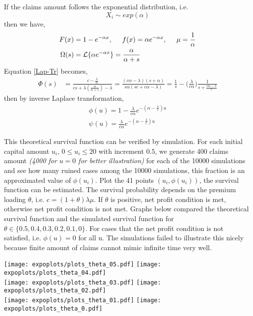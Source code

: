 \documentclass[12pt]{article}
\begin{document}
If the claims amount follows the exponential distribution, i.e. 
\[X_i\sim exp(\alpha)\]
then we have,
\begin{align*}
 F(x)&=1-e^{-\alpha x},
 \hspace{0.5cm}
 f(x)=\alpha e^{-\alpha x},
 \hspace{0.5cm}
 \mu=\frac{1}{\alpha}\\
 \Omega(s)&=\mathcal{L}\{\alpha e^{-\alpha x}\}=\frac{\alpha}{\alpha+s}
\end{align*}
Equation \eqref{Lap-Tr} becomes,
\begin{align*}
\Phi(s)&=\frac{c-\frac{\lambda}{\alpha}}{cs+\lambda(\frac{\alpha}{\alpha+s})-\lambda}=\frac{(c\alpha-\lambda)(s+\alpha)}{s\alpha(sc+c\alpha-\lambda)}=\frac{1}{s}-\Big(\frac{\lambda}{c\alpha}\Big)\frac{1}{s+\frac{c\alpha-\lambda}{c}}
\end{align*}
then by inverse Laplace transformation,
\begin{eqnarray}
\phi(u)=1-\frac{\lambda}{c\alpha}e^{-(\alpha-\frac{\lambda}{c})u}\label{hahaha}\label{exp_noinv_surv}\\
\psi(u)=\frac{\lambda}{c\alpha}e^{-(\alpha-\frac{\lambda}{c})u}\label{exp_noinv_ruin}
\end{eqnarray}

This theoretical survival function can be verified by simulation. For each initial capital amount \(u_i\), \(0\leq u_i\leq 20\) with increment \(0.5\), we generate 400 claims amount \textit{(4000 for \(u=0\) for better illustration)} for each of the 10000 simulations and see how many ruined cases among the 10000 simulations, this fraction is an approximated value of \(\phi(u_i)\). Plot the 41 points \((u_i,\phi(u_i))\), the survival function can be estimated. The survival probability depends on the premium loading \(\theta\), i.e. \(c=(1+\theta)\lambda\mu\). If \(\theta\) is positive, net profit condition is met, otherwise net profit condition is not met. Graphs below compared the theoretical survival function and the simulated survival function for \(\theta\in\{0.5,0.4,0.3,0.2,0.1,0\}\). For cases that the net profit condition is not satisfied, i.e. \(\phi(u)=0\) for all u. The simulations failed to illustrate this nicely because finite amount of claims cannot mimic infinite time very well.

\begin{flushleft}
\texttt{[image: expoplots/plots\_theta\_05.pdf]}
\texttt{[image: expoplots/plots\_theta\_04.pdf]}\\
\texttt{[image: expoplots/plots\_theta\_03.pdf]}
\texttt{[image: expoplots/plots\_theta\_02.pdf]}\\
\texttt{[image: expoplots/plots\_theta\_01.pdf]}
\texttt{[image: expoplots/plots\_theta\_0.pdf]}\\
\end{flushleft}
\end{document}

